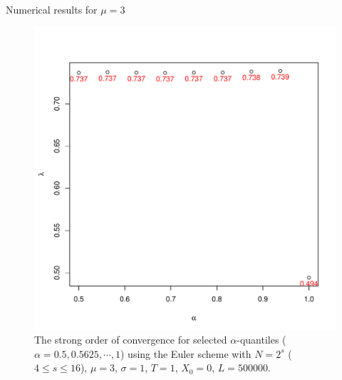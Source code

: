\documentclass[cjk,10pt]{beamer}
\begin{document}
\begin{frame}{Numerical results for $\mu=3$} 
\begin{figure}[p]
   \includegraphics[scale=0.3]{nout_4_25_3arato.pdf} %
   \caption{The strong order of convergence for selected $\alpha$-quantiles ($\alpha = 0.5, 0.5625, \cdots, 1$) using the Euler scheme with $N = 2^s$ ($4\le s \le 16$), $\mu=3$, $\sigma=1$, $T=1$, $X_0=0$, $L=500000$.}
   \label{f:ratio3}
\end{figure}
\end{frame}
\end{document}
